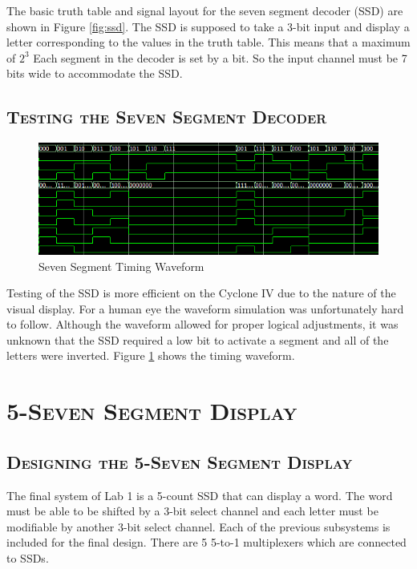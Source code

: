 \documentclass[11pt]{report}
\begin{document}
\begin{spacing}{1.5}
The basic truth table and signal layout for the seven segment decoder (SSD) are shown in Figure \ref{fig:ssd}.  The SSD is supposed to take a 3-bit input and display a letter corresponding to the values in the truth table.  This means that a maximum of $2^3$  Each segment in the decoder is set by a bit.  So the input channel must be 7 bits wide to accommodate the SSD.

\subsection{\scshape Testing the Seven Segment Decoder} %
\label{sub:test_ssd}

\begin{figure}[H]
    \centering
    \includegraphics[width=1\textwidth]{timing_ssd}
    \caption{Seven Segment Timing Waveform}
    \label{fig:timing_ssd}
\end{figure}

Testing of the SSD is more efficient on the Cyclone IV due to the nature of the visual display.  For a human eye the waveform simulation was unfortunately hard to follow.  Although the waveform allowed for proper logical adjustments, it was unknown that the SSD required a low bit to activate a segment and all of the letters were inverted.  Figure \ref{fig:timing_ssd} shows the timing waveform.

\section{\scshape 5-Seven Segment Display}
\label{sec:5_ssd}

\subsection{\scshape Designing the 5-Seven Segment Display} %
\label{sub:design_5_ssd}

The final system of Lab 1 is a 5-count SSD that can display a word.  The word must be able to be shifted by a 3-bit select channel and each letter must be modifiable by another 3-bit select channel.  Each of the previous subsystems is included for the final design.  There are 5 5-to-1 multiplexers which are connected to SSDs.   


\end{spacing}
\end{document}

